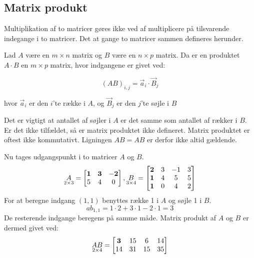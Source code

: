 \subsection{Matrix produkt}
Multiplikation af to matricer gøres ikke ved af multiplicere på tilsvarende indegange i to matricer. Det at gange to matricer sammen defineres herunder. 
\begin{defn} 
Lad $A$ være en $m \times n$ matrix og $B$ være en $n \times p$ matrix. Da er en produktet $A \cdot B$ en $m \times p$ matrix, hvor indgangene er givet ved: 

$$(AB)_{i,j} = \vec{a}_i \cdot \vec{B}_j$$

hvor $\vec{a}_i$ er den $i$'te række i $A$, og $\vec{B}_j$ er den $j$'te søjle i $B$
\label{def:(matrixprodukt)}
\end{defn}
Det er vigtigt at antallet af søjler i $A$ er det samme som antallet af rækker i $B$. Er det ikke tilfældet, så er matrix produktet ikke defineret. Matrix produktet er oftest ikke kommutativt. Ligningen $AB=AB$ er derfor ikke altid gældende. 
\begin{eks}
Nu tages udgangspunkt i to matricer $A$ og $B$. 
\begin{align*}
\underset{2 \times 3}{A}= \begin{bmatrix}
	\bf{1} & \bf{3} & \bf{-2} \\
	5 & 4 & 0 	
\end{bmatrix},
\underset{3 \times 4}{B}= \begin{bmatrix}
	\bf{2} & 3 & -1 & 3 \\
	\bf{1} & 4 & 5 & 5\\
	\bf{1} & 0 & 4 & 2
\end{bmatrix}  
\end{align*}
For at beregne indgang $(1,1)$ benyttes række 1 i $A$ og søjle 1 i $B$. 
$$ab_{1,1}=1\cdot 2+3\cdot 1-2 \cdot 1 = 3$$ 
De resterende indgange beregens på samme måde. 
Matrix produkt af $A$ og $B$ er dermed givet ved:
\begin{align*}
\underset{2 \times 4}{AB}= \begin{bmatrix}
	\bf{3} & 15 & 6 & 14 \\
	14 & 31 & 15 & 35
\end{bmatrix}  
\end{align*}
\end{eks}